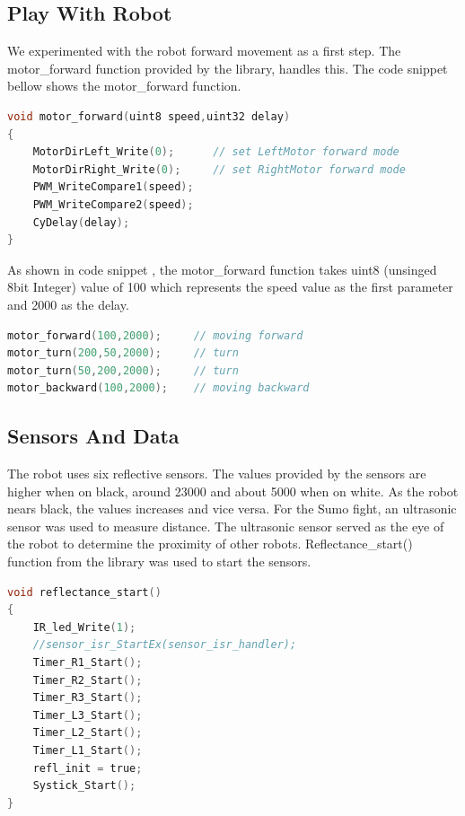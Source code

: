 \documentclass[11pt,a4paper,oneside,article]{memoir}
\begin{document}
\subsection{Play With Robot}
We experimented with the robot forward movement as a first step. The motor\_forward function provided by the library, handles this. The code snippet bellow shows the motor\_forward function.
\vspace{-22pt}\begin{lstlisting}[language=C,caption={Robot Forward Move},label=move.c] 
void motor_forward(uint8 speed,uint32 delay)
{
    MotorDirLeft_Write(0);      // set LeftMotor forward mode
    MotorDirRight_Write(0);     // set RightMotor forward mode
    PWM_WriteCompare1(speed); 
    PWM_WriteCompare2(speed); 
    CyDelay(delay);
}
\end{lstlisting}\vspace{-22pt}
As shown in code snippet  , the motor\_forward function takes uint8 (unsinged 8bit Integer) value of 100 which represents the speed value as the first parameter and 2000 as the delay.  
\vspace{-22pt}\begin{lstlisting}[language=C,caption={Robot Forward Move},label=move.c] 
motor_forward(100,2000);     // moving forward
motor_turn(200,50,2000);     // turn
motor_turn(50,200,2000);     // turn
motor_backward(100,2000);    // moving backward
\end{lstlisting}\vspace{-22pt}

\subsection{Sensors And Data}
The robot uses six reflective sensors. The values provided by the sensors are higher when on black, around 23000 and about 5000 when on white. 
As the robot nears black, the values increases and vice versa. For the Sumo fight, an ultrasonic sensor was used to measure distance. The ultrasonic sensor served as the eye of the robot to determine the proximity of other robots. Reflectance\_start() function from the library was used to start the sensors.
\vspace{-22pt}\begin{lstlisting}[language=C,caption={Reflectance},label=reflectance.c] 
void reflectance_start()
{
    IR_led_Write(1);
    //sensor_isr_StartEx(sensor_isr_handler);
    Timer_R1_Start();
    Timer_R2_Start();
    Timer_R3_Start();
    Timer_L3_Start();
    Timer_L2_Start();
    Timer_L1_Start();
    refl_init = true;
    Systick_Start();
}
\end{lstlisting}\vspace{-22pt}
\end{document}
